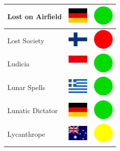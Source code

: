\documentclass[12pt, a4paper, twoside]{report}
\begin{document}
\begin{center}
\begin{longtable}{|p{5cm}|p{2cm}|p{2cm}|}
 Lost on Airfield                                           & \includegraphics[width=1cm]{../img/flags/de} &   \includegraphics[width=1cm]{../likes/y} \\ \hline
 Lost Society                                               & \includegraphics[width=1cm]{../img/flags/fi} &   \includegraphics[width=1cm]{../likes/n} \\ \hline
 Ludicia                                                    & \includegraphics[width=1cm]{../img/flags/id} &   \includegraphics[width=1cm]{../likes/y} \\ \hline
 Lunar Spells                                               & \includegraphics[width=1cm]{../img/flags/gr} &   \includegraphics[width=1cm]{../likes/y} \\ \hline
 Lunatic Dictator                                           & \includegraphics[width=1cm]{../img/flags/de} &   \includegraphics[width=1cm]{../likes/y} \\ \hline
 Lycanthrope                                                & \includegraphics[width=1cm]{../img/flags/au} &   \includegraphics[width=1cm]{../likes/m} \\ \hline

\end{longtable}
\end{center}
\end{document}
